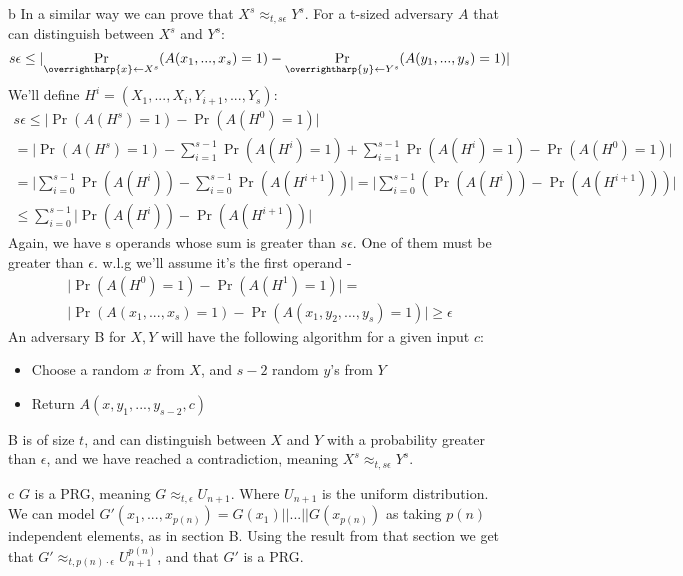 \documentclass{article}
\begin{document}
\begin{paragraph}
	b In a similar way we can prove that ${X^s \approx_{t, s\epsilon} Y^s}$. For a t-sized adversary ${A}$ that can distinguish between
	${X^s}$ and ${Y^s}$:
	\begin{equation*}
		s\epsilon \leq \lvert \Pr_{\overrightharp{x} \leftarrow X^s}(A(x_1, ... , x_s) = 1) - \Pr_{\overrightharp{y} \leftarrow Y^s}(A(y_1, ... , y_s) = 1) \rvert
	\end{equation*}
	We'll define ${H^i = (X_1,...,X_i,Y_{i+1},...,Y_s)}$:
	\begin{gather*}
		s\epsilon \leq \lvert \Pr(A(H^s) = 1) - \Pr(A(H^0) = 1) \rvert \\
		= \lvert \Pr(A(H^s) = 1) - \sum_{i = 1}^{s - 1} \Pr(A(H^i) = 1) + \sum_{i = 1}^{s - 1} \Pr(A(H^i) = 1) - \Pr(A(H^0) = 1) \rvert \\
		= \lvert \sum_{i = 0}^{s-1} \Pr(A(H^i)) - \sum_{i = 0}^{s-1} \Pr(A(H^{i+1})) \rvert
		= \lvert \sum_{i = 0}^{s-1} (\Pr(A(H^i)) - \Pr(A(H^{i+1}))) \rvert \\
		\leq \sum_{i = 0}^{s-1} {\lvert \Pr(A(H^i)) - \Pr(A(H^{i+1})) \rvert }
	\end{gather*}
	Again, we have s operands whose sum is greater than ${s\epsilon}$. One of them must be greater than ${\epsilon}$.
	w.l.g we'll assume it's the first operand -
	\begin{gather*}
		\lvert \Pr(A(H^0) = 1) - \Pr(A(H^1) = 1) \rvert = \\
		\lvert \Pr(A(x_1, ... , x_s) = 1) - \Pr(A(x_1, y_2, ... , y_s) = 1) \rvert \geq \epsilon
	\end{gather*}
	An adversary B for ${X, Y}$ will have the following algorithm for a given input ${c}$:
	\begin{itemize}
		\item Choose a random ${x}$ from ${X}$, and ${s-2}$ random ${y}$'s from ${Y}$
		\item Return ${A(x, y_1,..., y_{s-2}, c)}$
	\end{itemize}
	B is of size ${t}$, and can distinguish between ${X}$ and ${Y}$ with a probability greater than ${\epsilon}$,
	and we have reached a contradiction, meaning ${X^s \approx_{t, s\epsilon} Y^s}$.
\end{paragraph}

\begin{paragraph}
	c ${G}$ is a PRG, meaning ${G \approx_{t,\epsilon} U_{n+1}}$. Where ${U_{n+1}}$ is the uniform distribution.
	We can model ${G'(x_1,...,x_{p(n)}) = G(x_1)||...||G(x_{p(n)})}$ as taking ${p(n)}$ independent elements, as in section B.
	Using the result from that section we get that ${G' \approx_{t,p(n)\cdot \epsilon} U_{n+1}^{p(n)}}$, and that ${G'}$ is a PRG.
\end{paragraph}
\end{document}
